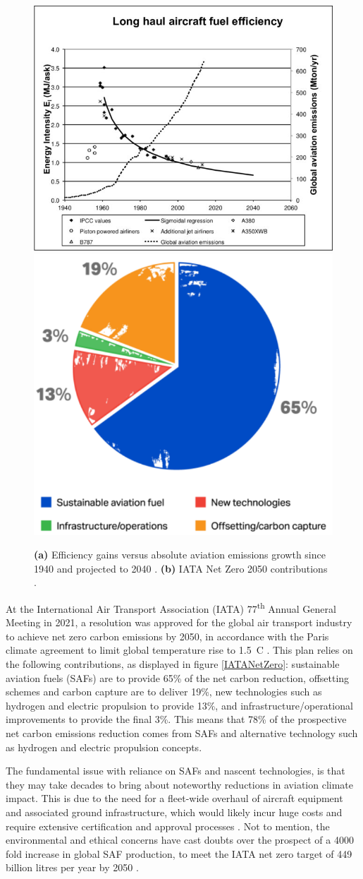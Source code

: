 \begin{figure}[H]
	\centering
	\subfloat
		{
		\includegraphics[width=.4\textwidth]{eff_vs_growth.jpg}
		\label{eff_vs_growth}
		}
	\subfloat
		{
		\includegraphics[width=.33\textwidth]{IATANetZero.png}
		\label{IATANetZero}
		}
	\caption{\textbf{(a)} Efficiency gains versus absolute aviation emissions growth since 1940 and projected to 2040 \cite{Peeters2016}. \textbf{(b)} IATA Net Zero 2050 contributions \cite{IATANetZero}.}
	\label{}
\end{figure}

At the International Air Transport Association (IATA) 77\textsuperscript{th} Annual General Meeting in 2021, a resolution was approved for the global air transport industry to achieve net zero carbon emissions by 2050, in accordance with the Paris climate agreement to limit global temperature rise to 1.5~\textdegree C \cite{IATANetZero}. This plan relies on the following contributions, as displayed in figure \ref{IATANetZero}: sustainable aviation fuels (SAFs) are to provide 65\% of the net carbon reduction, offsetting schemes and carbon capture are to deliver 19\%, new technologies such as hydrogen and electric propulsion to provide 13\%, and infrastructure/operational improvements to provide the final 3\%. This means that 78\% of the prospective net carbon emissions reduction comes from SAFs and alternative technology such as hydrogen and electric propulsion concepts. 

The fundamental issue with reliance on SAFs and nascent technologies, is that they may take decades to bring about noteworthy reductions in aviation climate impact. This is due to the need for a fleet-wide overhaul of aircraft equipment and associated ground infrastructure, which would likely incur huge costs and require extensive certification and approval processes \cite{ICF2021}. Not to mention, the environmental and ethical concerns have cast doubts over the prospect of a 4000 fold increase in global SAF production, to meet the IATA net zero target of 449 billion litres per year by 2050 \cite{IATANetZero, Henoi2022}. 

